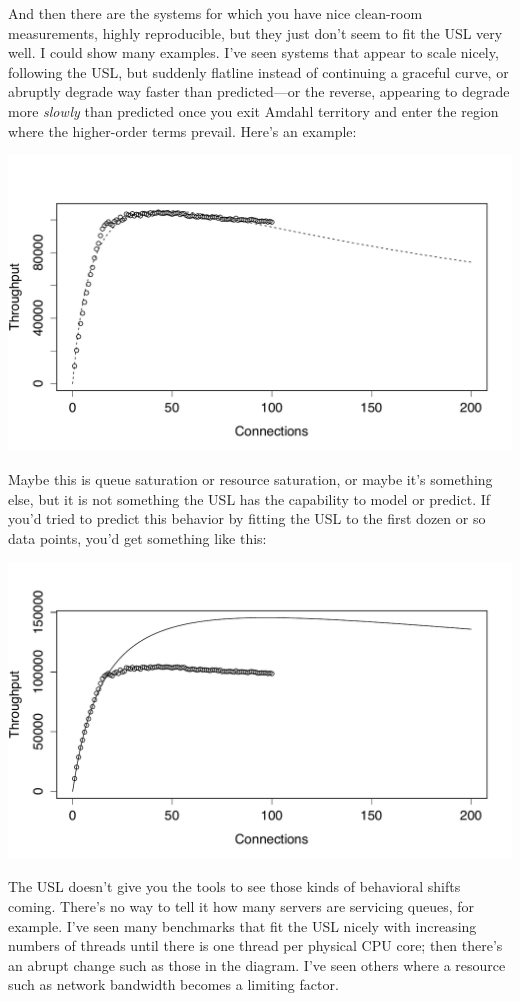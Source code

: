 \documentclass{vivid_layout}
\begin{document}
And then there are the systems for which you have nice clean-room measurements,
highly reproducible, but they just don't seem to fit the USL very well. I could show
many examples. I've seen systems that appear to scale nicely, following the USL,
but suddenly flatline instead of continuing a graceful curve, or abruptly
degrade way faster than predicted---or the reverse, appearing to degrade more
{\itshape slowly} than predicted once you exit Amdahl territory and enter the
region where the higher-order terms prevail.  Here's an example:
\begin{center}
\includegraphics[width=.85\linewidth]{scalability/handlersocket}
\end{center}

Maybe this is queue saturation or resource saturation, or maybe it's something
else, but it is not something the USL has the capability to model or predict. If
you'd tried to predict this behavior by fitting the USL to the first dozen or so
data points, you'd get something like this:
\begin{center}
\includegraphics[width=.85\linewidth]{scalability/handlersocket-2}
\end{center}

The USL doesn't give you the tools to see those kinds of behavioral shifts
coming. There's no way to tell it how many servers are servicing queues, for
example. I've seen many benchmarks that fit the USL nicely with increasing
numbers of threads until there is one thread per physical CPU core; then there's
an abrupt change such as those in the diagram. I've seen others where a resource
such as network bandwidth becomes a limiting factor.
\end{document}
